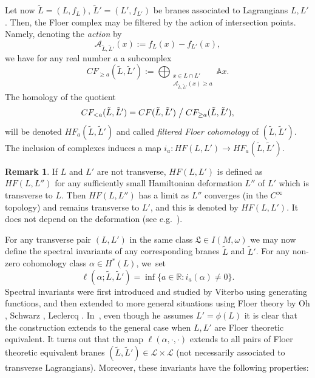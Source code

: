 \documentclass[10pt,a4paper]{amsart}
\providecommand{\eg}{e.g.\ }
\theoremstyle{definition}
\newtheorem{rem}[thm]{Remark}
\newcommand {\LL}{{\mathcal L}}
\newcommand{\R}{\mathbb{R}}
\newcommand{\fL}{\mathfrak {L}}
\begin{document}
Let now $\tilde L=(L,f_L)$, $\tilde L'=(L',f_{L'})$ be branes associated to Lagrangians $L, L'$. Then, the Floer complex may be filtered by the action of intersection points. Namely, denoting the \emph{action} by
\[
\mathcal A_{\tilde L,\tilde L'}(x):=f_{L}(x)-f_{L'}(x),
\]
we have for any real number $a$ a subcomplex
\[
CF_{\geq a}(\tilde L,\tilde L'):=\bigoplus_{\substack{x\in L\cap L'\\ \mathcal A_{\tilde L,\tilde L'}(x)\geq a}}\mathbb{A}x.
\]
The homology of the quotient
\[
CF_{<a}(\tilde L,\tilde L')=CF(\tilde L,\tilde L')\bigm/CF_{\geq a}(\tilde L,\tilde L'),
\]
will be denoted $HF_{a}(\tilde L,\tilde L')$ and called \emph{filtered Floer cohomology} of $(\tilde L,\tilde L')$. The inclusion of complexes induces a map $i_a:HF(L,L')\to HF_a(\tilde L,\tilde L')$.
\begin{rem}
If $L$ and $L'$ are not transverse, $HF(L,L')$ is defined as $HF(L,L'')$ for any sufficiently small Hamiltonian deformation $L''$ of $L'$ which is transverse to $L$. Then $HF(L,L'')$ has a limit as $L''$ converges (in the $C^\infty$ topology) and remains transverse to $L'$, and this is denoted by $HF(L,L')$. It does not depend on the deformation (see \eg \cite{Seidel}).
\end{rem}

\setcounter{thm}{5}

For any transverse pair $(L, L')$ in the same class $\fL\in I(M,\omega)$ we may now define the spectral invariants of any corresponding branes $\tilde L$ and $\tilde L'$. For any non-zero cohomology class $\alpha\in H^*(L)$, we~set
\[
\ell(\alpha;\tilde L,\tilde L')=\inf\{a\in\R : i_a(\alpha)\neq 0\}.
\]
Spectral invariants were first introduced and studied by Viterbo \cite{Viterbo-STAGGF} using generating functions, and then extended to more general situations using Floer theory by Oh \cite{Oh-action-functional-I}, Schwarz \cite{Schwarz}, Leclercq \cite{Leclercq}. In~\cite{Leclercq}, even though he assumes $L'=\phi(L)$ it is clear that the construction extends to the general case when $L, L'$ are Floer theoretic equivalent.
It turns out that the map $\ell(\alpha, \cdot, \cdot)$ extends to all pairs of Floer theoretic equivalent branes $(\tilde L,\tilde L')\in\LL\times \LL$ (not necessarily associated to transverse Lagrangians). Moreover, these invariants have the following properties:
\end{document}
